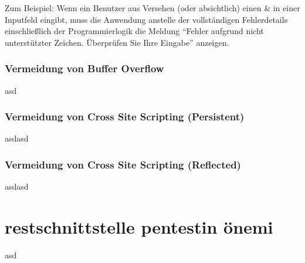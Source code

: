 Zum Beispiel: Wenn ein Benutzer aus Versehen (oder absichtlich) einen \& in einer Inputfeld eingibt, muss die Anwendung anstelle der vollständigen Fehlerdetails einschließlich der Programmierlogik die Meldung "`Fehler aufgrund nicht unterstützter Zeichen. Überprüfen Sie Ihre Eingabe"' anzeigen\cite{ase17}.

\subsubsection{Vermeidung von Buffer Overflow}

asd

\subsubsection{Vermeidung von Cross Site Scripting (Persistent)}

asdasd

\subsubsection{Vermeidung von Cross Site Scripting (Reflected)}

asdasd

\section{restschnittstelle pentestin önemi}

asd
